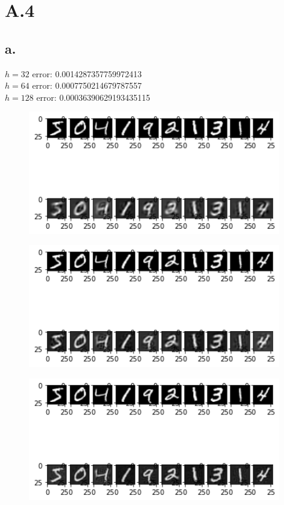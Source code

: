 \documentclass{article}
\newcommand{\1}{\mathbf{1}}
\begin{document}
\section*{A.4}
{\Large 

\subsection*{a.}

$h = 32$ error: 0.0014287357759972413 \\
$h = 64$ error: 0.0007750214679787557 \\
$h = 128$ error: 0.00036390629193435115 \\

\begin{figure}[!hb]
  \centering
  \includegraphics[width=110mm]{../hw4-code/results/a4_a32.png}
\end{figure}

\begin{figure}[!hb]
  \centering
  \includegraphics[width=110mm]{../hw4-code/results/a4_a64.png}
\end{figure}

\begin{figure}[!hb]
  \centering
  \includegraphics[width=110mm]{../hw4-code/results/a4_a128.png}
\end{figure}

}
\end{document}
